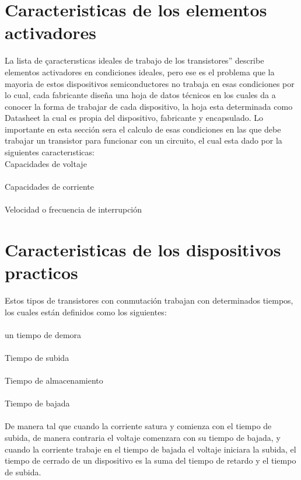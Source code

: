 \documentclass[12pt,a4paper]{article}
\begin{document}
\section{Caracteristicas de los elementos activadores}
La lista de çaracterısticas ideales de trabajo de los transistores” describe elementos activadores en
condiciones ideales, pero ese es el problema que la mayoria de estos dispositivos semiconductores no
trabaja en esas condiciones por lo cual, cada fabricante diseña una hoja de datos técnicos en los cuales
da a conocer la forma de trabajar de cada dispositivo, la hoja esta determinada como Datasheet la
cual es propia del dispositivo, fabricante y encapsulado.
Lo importante en esta sección sera el calculo de esas condiciones en las que debe trabajar un
transistor para funcionar con un circuito, el cual esta dado por la siguientes caracterısticas:\\

Capacidades de voltaje\\\\
Capacidades de corriente\\\\
Velocidad o frecuencia de interrupción

\section{Caracteristicas de los dispositivos practicos}
Estos tipos de transistores con conmutación trabajan con determinados tiempos, los cuales están
definidos como los siguientes:\\\\
un tiempo de demora\\\\
Tiempo de subida\\\\
Tiempo de almacenamiento\\\\
Tiempo de bajada\\\\
De manera tal que cuando la corriente satura y comienza con el tiempo de subida, de manera
contraria el voltaje comenzara con su tiempo de bajada, y cuando la corriente trabaje en el tiempo
de bajada el voltaje iniciara la subida, el tiempo de cerrado de un dispositivo es la suma del tiempo
de retardo y el tiempo de subida.
\end{document}
